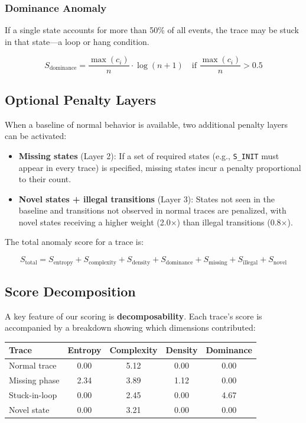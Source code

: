 \documentclass[11pt]{article}
\begin{document}
\subsubsection{Dominance Anomaly}

If a single state accounts for more than 50\% of all events, the trace may be stuck in that state---a loop or hang condition.

\begin{equation}
    S_{\text{dominance}} = \frac{\max(c_i)}{n} \cdot \log(n + 1) \quad \text{if } \frac{\max(c_i)}{n} > 0.5
\end{equation}

\subsection{Optional Penalty Layers}

When a baseline of normal behavior is available, two additional penalty layers can be activated:

\begin{itemize}[leftmargin=*,itemsep=2pt]
    \item \textbf{Missing states} (Layer 2): If a set of required states (e.g., \texttt{S\_INIT} must appear in every trace) is specified, missing states incur a penalty proportional to their count.
    \item \textbf{Novel states + illegal transitions} (Layer 3): States not seen in the baseline and transitions not observed in normal traces are penalized, with novel states receiving a higher weight (2.0$\times$) than illegal transitions (0.8$\times$).
\end{itemize}

The total anomaly score for a trace is:

\begin{equation}
    S_{\text{total}} = S_{\text{entropy}} + S_{\text{complexity}} + S_{\text{density}} + S_{\text{dominance}} + S_{\text{missing}} + S_{\text{illegal}} + S_{\text{novel}}
\end{equation}

\subsection{Score Decomposition}

A key feature of our scoring is \textbf{decomposability}. Each trace's score is accompanied by a breakdown showing which dimensions contributed:

\begin{center}
\begin{tabular}{lcccc}
\toprule
\textbf{Trace} & \textbf{Entropy} & \textbf{Complexity} & \textbf{Density} & \textbf{Dominance} \\
\midrule
Normal trace       & 0.00 & 5.12 & 0.00 & 0.00 \\
Missing phase      & 2.34 & 3.89 & 1.12 & 0.00 \\
Stuck-in-loop      & 0.00 & 2.45 & 0.00 & 4.67 \\
Novel state        & 0.00 & 3.21 & 0.00 & 0.00 \\
\bottomrule
\end{tabular}
\end{center}
\end{document}

